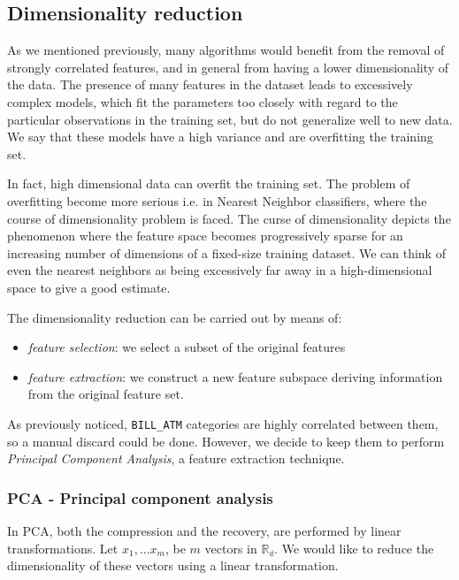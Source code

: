 \documentclass{article}
\begin{document}
\subsection{Dimensionality reduction}

As we mentioned previously, many algorithms would benefit from the removal of strongly correlated features, and in general from having a lower dimensionality of the data. The presence of many features in the dataset leads to excessively complex models, which fit the parameters too closely with regard to the particular observations in the training set, but do not generalize well to new data. We say that these models have a high variance and are overfitting the training set.

In fact, high dimensional data can overfit the training set. The problem of overfitting become more serious i.e. in Nearest Neighbor classifiers, where the course of dimensionality problem is faced. The curse of dimensionality depicts the phenomenon where the feature space becomes progressively sparse for an increasing number of dimensions of a fixed-size training dataset. We can think of even the nearest neighbors as being excessively far away in a high-dimensional space to give a good estimate.

The dimensionality reduction can be carried out by means of:

\begin{itemize}
    \item \emph{feature selection}: we select a subset of the original features
    \item \emph{feature extraction}: we construct a new feature subspace deriving information from the original feature set.
\end{itemize}

As previously noticed, \texttt{BILL\_ATM} categories are highly correlated between them, so a manual discard could be done. However, we decide to keep them to perform \emph{Principal Component Analysis}, a feature extraction technique.

\subsubsection{PCA - Principal component analysis}

In PCA, both the compression and the recovery, are performed by linear transformations. Let $x_{1}, ... x_{m}$, be $m$ vectors in $ \mathbb{R_{d}}$. We would like to reduce the dimensionality of these vectors using a linear transformation.
\end{document}
